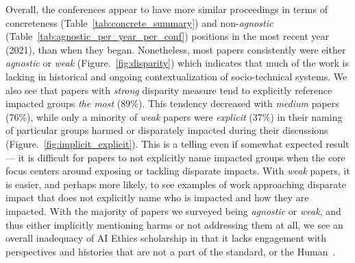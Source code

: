 \documentclass[manuscript]{acmart}
\begin{document}
Overall, the conferences appear to have more similar proceedings in terms of concreteness (Table~\ref{tab:concrete_summary}) and non-\textit{agnostic} (Table~\ref{tab:agnostic_per_year_per_conf}) positions in the most recent year (2021), than when they began. %
Nonetheless, %
most papers consistently were either \textit{agnostic} or \textit{weak} (Figure.~\ref{fig:disparity}) which indicates that much of the work is lacking in historical and ongoing contextualization of %
socio-technical systems. %
We also see that papers with \textit{strong} disparity measure tend to explicitly reference impacted groups \textit{the most} (89\%). This tendency decreased with \textit{medium} papers (76\%), while only a minority of \textit{weak} papers were \textit{explicit} (37\%) in their naming of particular groups harmed or disparately impacted  during their discussions (Figure.~\ref{fig:implicit_explicit}). This is a telling even if somewhat expected result --- it is difficult for papers to not explicitly name impacted groups when the core focus %
centers around exposing or tackling disparate impacts. With \textit{weak} papers, it is easier, and perhaps more likely, to see examples of work approaching disparate impact that does not explicitly name who is impacted and how they are impacted. %
With the majority of papers we surveyed being \textit{agnostic} or \textit{weak}, and thus either implicitly mentioning harms or not addressing them at all, we see an overall inadequacy of AI Ethics scholarship in that it lacks %
engagement with perspectives and histories that are not a part of the standard, or the Human~\cite{Wynter03}. 
\end{document}
